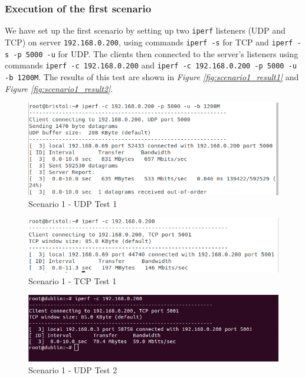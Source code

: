 \documentclass{article}
\begin{document}
\subsubsection{Execution of the first scenario}
We have set up the first scenario by setting up two \texttt{iperf} listeners (UDP and TCP) on server \texttt{192.168.0.200}, using commands \texttt{iperf -s} for TCP and \texttt{iperf -s -p 5000 -u} for UDP. The clients then connected to the server's listeners using commands \texttt{iperf -c 192.168.0.200} and \texttt{iperf -c 192.168.0.200 -p 5000 -u -b 1200M}. The results of this test are shown in \textit{Figure \ref{fig:scenario1_result1}} and \textit{Figure \ref{fig:scenario1_result2}}.

\begin{figure}[H]
\includegraphics[width=14cm]{figures/q2-2-1-udp-1.png}
\centering
\caption{Scenario 1 - UDP Test 1}
\centering
\label{fig:throughput_udp_test_1}
\end{figure}


\begin{figure}[H]
\includegraphics[width=14cm]{figures/q2-2-1-tcp-1.png}
\centering
\caption{Scenario 1 - TCP Test 1}
\centering
\label{fig:throughput_tcp_test_1}
\end{figure}


\begin{figure}[H]
\includegraphics[width=14cm]{figures/q2-2-1-udp-2.png}
\centering
\caption{Scenario 1 - UDP Test 2}
\centering
\label{fig:throughput_udp_test_2}
\end{figure}
\end{document}
